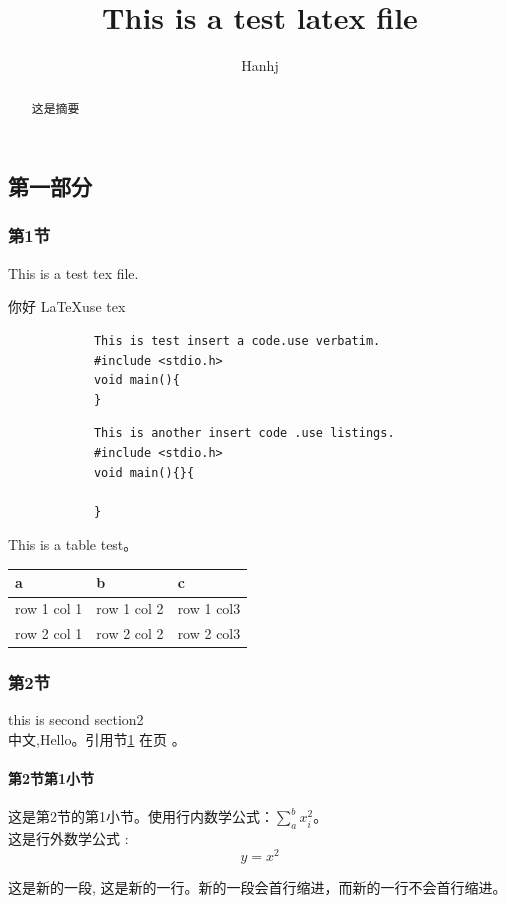 \documentclass{article}
\begin{document}
\begin{CJK}{UTF8}{gbsn}
	\title {This is a test latex file}
	\author {Hanhj}
	\maketitle
	\tableofcontents
	\begin{abstract}
		这是摘要
	\end{abstract}
	\newpage
	\part{第一部分}
	\section{第1节}
        \label{mark1}
		\par
	    This is a test tex file.
		\par
		你好 \LaTeX{use tex} 
		\par 
		\begin{verbatim}
			This is test insert a code.use verbatim.
			#include <stdio.h>
			void main(){
			}
		\end{verbatim}
		\begin{lstlisting}
			This is another insert code .use listings.
			#include <stdio.h>
			void main(){}{
			
			}
		\end{lstlisting}
		This is a table test。\\
		\begin{tabular}{|l|l|l|}
			\hline
			\cline{1-3}
			a & b & c \\
			\hline
			row 1 col 1 & row 1 col 2 & row 1 col3 \\
			\hline
			row 2 col 1 & row 2 col 2 & row 2 col3 \\
			\hline
		\end{tabular}

	\section{第2节}	
		this is second section2\\
		中文,Hello。引用节\ref{mark1} 在页\pageref{mark1} 。
		\subsection{第2节第1小节}
		这是第2节的第1小节。使用行内数学公式：$\sum_a^bx_i^2$。\\
		这是行外数学公式 :$$y=x^2$$
		\par 
		这是新的一段,
		\newline
		这是新的一行。新的一段会首行缩进，而新的一行不会首行缩进。
	

\end{CJK}
\end{document}
